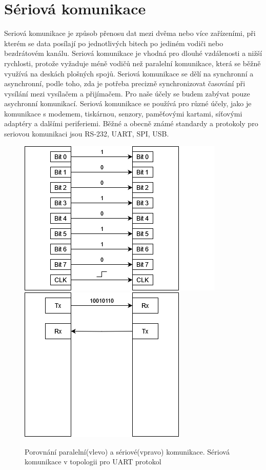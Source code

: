 \chapter{Sériová komunikace}
\label{Sériová komunikace}

Seriová komunikace je způsob přenosu dat mezi dvěma nebo více zařízeními, při kterém se data posílají po jednotlivých bitech po jediném vodiči nebo bezdrátovém kanálu. Seriová komunikace je vhodná pro dlouhé vzdálenosti a nižší rychlosti, protože vyžaduje méně vodičů než paralelní komunikace, která se běžně využívá na deskách plošných spojů. Seriová komunikace se dělí na synchronní a asynchronní, podle toho, zda je potřeba precizně synchronizovat časování při vysílání mezi vysílačem a přijímačem. Pro naše účely se budem zabývat pouze asychronní komunikací. Seriová komunikace se používá pro různé účely, jako je komunikace s modemem, tiskárnou, senzory, paměťovými kartami, síťovými adaptéry a dalšími periferiemi. Běžné a obecně známé standardy a protokoly pro seriovou komunikaci jsou RS-232, UART, SPI, USB.
\cite{ser kom}
\begin{figure}[!h]
    \begin{center}
        \includegraphics[scale=0.62]{obrazky/paralelni_komunikace.png}
        \includegraphics[scale=0.62]{obrazky/Seriova komunikace.png}
    \end{center}
    \caption[Porovnání seriové a paralelní komunikace]{Porovnání paralelní(vlevo) a sériové(vpravo) komunikace. Sériová komunikace v topologii pro UART protokol}
\end{figure}

